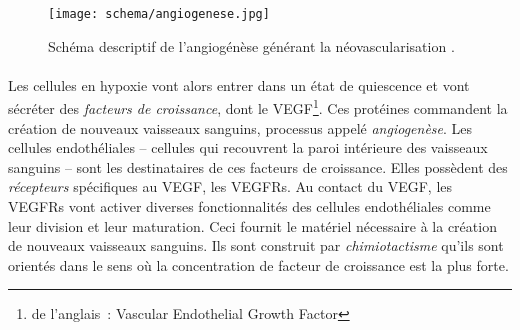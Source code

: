 \documentclass[main.tex]{subfiles}
\begin{document}
\begin{wrapfigure}[26]{O}{.62\textwidth}
\vspace{10mm}
\texttt{[image: schema/angiogenese.jpg]}
\caption{\label{fig:schema_angio} Schéma descriptif de l'angiogénèse générant la néovascularisation \cite{webangiogenese}.}
\end{wrapfigure}


\paragraph{}
Les cellules en hypoxie vont alors entrer dans un état de quiescence et vont sécréter des \emph{facteurs de croissance}, dont le VEGF\footnote{de l'anglais~: Vascular Endothelial Growth Factor}. 
Ces protéines commandent la création de nouveaux vaisseaux  
 sanguins, processus appelé \emph{angiogenèse}. 
Les cellules endothéliales -- cellules qui recouvrent la paroi intérieure des vaisseaux sanguins -- sont les destinataires de ces facteurs de croissance. 
Elles possèdent des \emph{récepteurs} spécifiques au VEGF, les VEGFRs. 
Au contact du VEGF, les VEGFRs vont activer diverses fonctionnalités des cellules endothéliales comme leur division et leur maturation. 
Ceci fournit le matériel nécessaire à la création de nouveaux vaisseaux sanguins. 
Ils sont construit par \emph{chimiotactisme} \cad qu'ils sont 
 orientés dans le sens où la concentration de facteur de croissance est la plus forte. 
\end{document}
